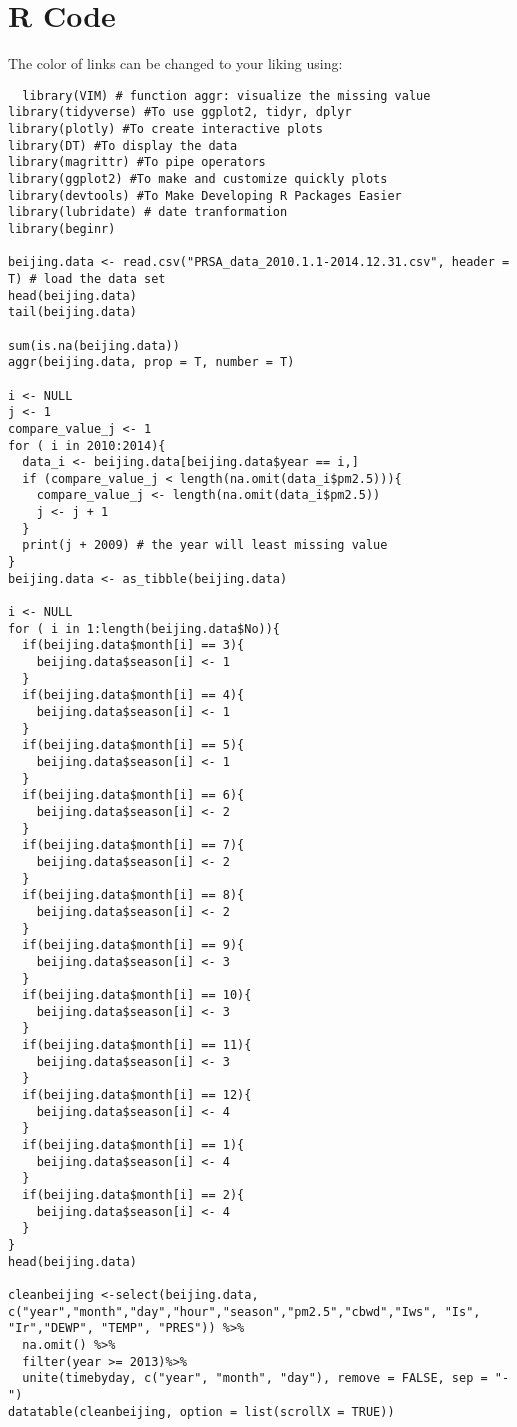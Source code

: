
\chapter{R Code} %

\label{AppendixA} %

The color of links can be changed to your liking using:
\begin{verbatim}
  library(VIM) # function aggr: visualize the missing value
library(tidyverse) #To use ggplot2, tidyr, dplyr
library(plotly) #To create interactive plots
library(DT) #To display the data
library(magrittr) #To pipe operators
library(ggplot2) #To make and customize quickly plots
library(devtools) #To Make Developing R Packages Easier
library(lubridate) # date tranformation
library(beginr)

beijing.data <- read.csv("PRSA_data_2010.1.1-2014.12.31.csv", header = T) # load the data set
head(beijing.data)
tail(beijing.data)

sum(is.na(beijing.data))
aggr(beijing.data, prop = T, number = T)

i <- NULL
j <- 1
compare_value_j <- 1
for ( i in 2010:2014){
  data_i <- beijing.data[beijing.data$year == i,]
  if (compare_value_j < length(na.omit(data_i$pm2.5))){
    compare_value_j <- length(na.omit(data_i$pm2.5))
    j <- j + 1
  }
  print(j + 2009) # the year will least missing value
}
beijing.data <- as_tibble(beijing.data)

i <- NULL
for ( i in 1:length(beijing.data$No)){
  if(beijing.data$month[i] == 3){
    beijing.data$season[i] <- 1
  }
  if(beijing.data$month[i] == 4){
    beijing.data$season[i] <- 1
  }
  if(beijing.data$month[i] == 5){
    beijing.data$season[i] <- 1
  }
  if(beijing.data$month[i] == 6){
    beijing.data$season[i] <- 2
  }
  if(beijing.data$month[i] == 7){
    beijing.data$season[i] <- 2
  }
  if(beijing.data$month[i] == 8){
    beijing.data$season[i] <- 2
  }
  if(beijing.data$month[i] == 9){
    beijing.data$season[i] <- 3
  }
  if(beijing.data$month[i] == 10){
    beijing.data$season[i] <- 3
  }
  if(beijing.data$month[i] == 11){
    beijing.data$season[i] <- 3
  }
  if(beijing.data$month[i] == 12){
    beijing.data$season[i] <- 4
  }
  if(beijing.data$month[i] == 1){
    beijing.data$season[i] <- 4
  }
  if(beijing.data$month[i] == 2){
    beijing.data$season[i] <- 4
  }
}
head(beijing.data)

cleanbeijing <-select(beijing.data, c("year","month","day","hour","season","pm2.5","cbwd","Iws", "Is", "Ir","DEWP", "TEMP", "PRES")) %>%
  na.omit() %>%
  filter(year >= 2013)%>%
  unite(timebyday, c("year", "month", "day"), remove = FALSE, sep = "-")
datatable(cleanbeijing, option = list(scrollX = TRUE))


\end{verbatim}
